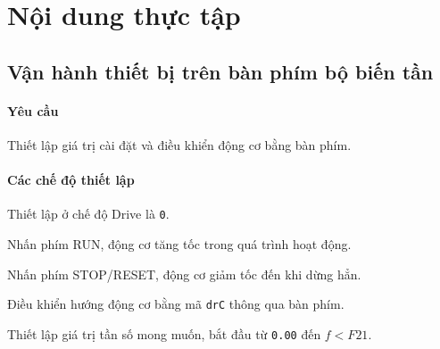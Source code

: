 \documentclass[13pt,a4paper]{extarticle}
\begin{document}
\section{Nội dung thực tập}
\subsection{Vận hành thiết bị trên bàn phím bộ biến tần}
\paragraph{Yêu cầu}Thiết lập giá trị cài đặt và điều khiển động cơ bằng bàn phím.
\paragraph{Các chế độ thiết lập}
\begin{list}{--}{}
\item Thiết lập ở chế độ Drive là \verb|0|.
\item Nhấn phím RUN, động cơ tăng tốc trong quá trình hoạt động.
\item Nhấn phím STOP/RESET, động cơ giảm tốc đến khi dừng hẳn.
\item Điều khiển hướng động cơ bằng mã \verb|drC| thông qua bàn phím.
\item Thiết lập giá trị tần số mong muốn, bắt đầu từ \verb|0.00| đến $f < F21$.
\end{list}
\end{document}
